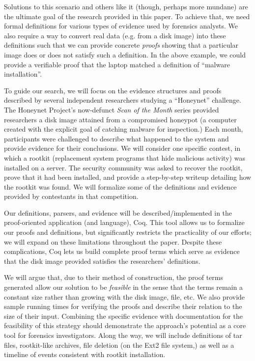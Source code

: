 \documentclass[nocopyrightspace,preprint]{sigplanconf}
\begin{document}
Solutions to this scenario and others like it (though, perhaps more mundane)
are the ultimate goal of the research provided in this paper. To achieve that,
we need formal definitions for various types of evidence used by forensics
analysts.  We also require a way to convert real data (e.g. from a disk image)
into these definitions such that we can provide concrete {\em proofs} showing
that a particular image does or does not satisfy such a definition. In the
above example, we could provide a verifiable proof that the laptop matched a
definition of ``malware installation''. 

To guide our search, we will focus on the evidence structures and proofs
described by several independent researchers studying a ``Honeynet''
challenge. The Honeynet Project\cite{honeynet}'s now-defunct {\it Scan of the
Month} series provided researchers a disk image attained from a compromised
honeypot (a computer created with the explicit goal of catching malware for
inspection.) Each month, participants were challenged to describe what
happened to the system and provide evidence for their conclusions. We will
consider one specific contest\cite{honeynet-15}, in which a rootkit
(replacement system programs that hide malicious activity) was installed on a
server. The security community was asked to recover the rootkit, prove that it
had been installed, and provide a step-by-step writeup detailing how the
rootkit was found. We will formalize some of the definitions and evidence
provided by contestants in that competition.

Our definitions, parsers, and evidence will be described/implemented in the
proof-oriented application (and language), Coq. This tool allows us to
formalize our proofs and definitions, but significantly restricts the
practicality of our efforts; we will expand on these limitations throughout
the paper. Despite these complications, Coq lets us build complete proof terms
which serve as evidence that the disk image provided satisfies the
researchers' definitions.

We will argue that, due to their method of construction, the proof terms
generated allow our solution to be {\em feasible} in the sense that the terms
remain a constant size rather than growing with the disk image, file, etc. We
also provide sample running times for verifying the proofs and describe their
relation to the size of their input. Combining the specific evidence with
documentation for the feasibility of this strategy should demonstrate the
approach's potential as a core tool for forensics investigators. Along the
way, we will include definitions of tar files, rootkit-like archives, file
deletion (on the Ext2 file system,) as well as a timeline of events consistent
with rootkit installation.
\end{document}
